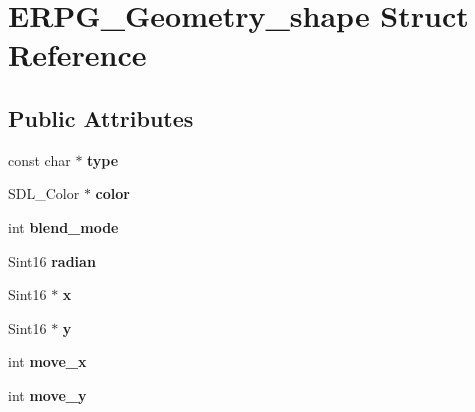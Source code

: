 \hypertarget{structERPG__Geometry__shape}{\section{E\-R\-P\-G\-\_\-\-Geometry\-\_\-shape Struct Reference}
\label{structERPG__Geometry__shape}
}
\subsection*{Public Attributes}
\begin{DoxyCompactItemize}
\item 
\hypertarget{structERPG__Geometry__shape_a50200237d240f841dedd1ba581ab309c}{const char $\ast$ {\bfseries type}}\label{structERPG__Geometry__shape_a50200237d240f841dedd1ba581ab309c}

\item 
\hypertarget{structERPG__Geometry__shape_a2c9501c8a5846063e57ab298b6454359}{S\-D\-L\-\_\-\-Color $\ast$ {\bfseries color}}\label{structERPG__Geometry__shape_a2c9501c8a5846063e57ab298b6454359}

\item 
\hypertarget{structERPG__Geometry__shape_abc7aa351476279876b9b22ccde9a8e1c}{int {\bfseries blend\-\_\-mode}}\label{structERPG__Geometry__shape_abc7aa351476279876b9b22ccde9a8e1c}

\item 
\hypertarget{structERPG__Geometry__shape_a3e961dad39050462d968204541e27014}{Sint16 {\bfseries radian}}\label{structERPG__Geometry__shape_a3e961dad39050462d968204541e27014}

\item 
\hypertarget{structERPG__Geometry__shape_a90d997c5e7a2c18fb5ada1daa6affdd0}{Sint16 $\ast$ {\bfseries x}}\label{structERPG__Geometry__shape_a90d997c5e7a2c18fb5ada1daa6affdd0}

\item 
\hypertarget{structERPG__Geometry__shape_af9efa4bf6c5ca6ea787662ef53bb1e7a}{Sint16 $\ast$ {\bfseries y}}\label{structERPG__Geometry__shape_af9efa4bf6c5ca6ea787662ef53bb1e7a}

\item 
\hypertarget{structERPG__Geometry__shape_a27a136e99d06b7a6e68f3d609c7ac7e4}{int {\bfseries move\-\_\-x}}\label{structERPG__Geometry__shape_a27a136e99d06b7a6e68f3d609c7ac7e4}

\item 
\hypertarget{structERPG__Geometry__shape_ae150755a3a70a8a3dd047f1b38533859}{int {\bfseries move\-\_\-y}}\label{structERPG__Geometry__shape_ae150755a3a70a8a3dd047f1b38533859}


\end{DoxyCompactItemize}
